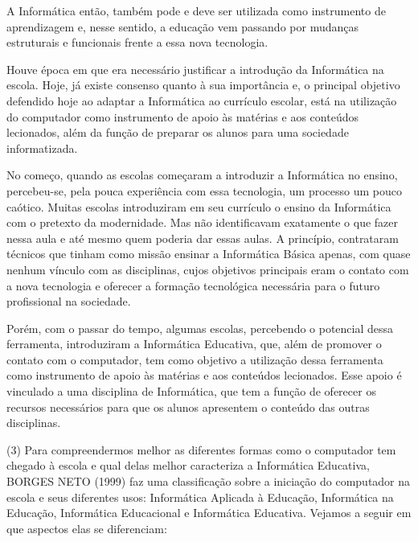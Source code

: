 \documentclass[a4paper,12pt]{report}
\begin{document}
    A Informática então, também pode e deve ser utilizada como instrumento de
    aprendizagem e, nesse sentido, a educação vem passando por mudanças
    estruturais e funcionais frente a essa nova tecnologia.

    Houve época em que era necessário justificar a introdução da Informática na
    escola. Hoje, já existe consenso quanto à sua importância e, o principal
    objetivo defendido hoje ao adaptar a Informática ao currículo escolar, está
    na utilização do computador como instrumento de apoio às matérias e aos
    conteúdos lecionados, além da função de preparar os alunos para uma
    sociedade informatizada.

    No começo, quando as escolas começaram a introduzir a Informática no ensino,
    percebeu-se, pela pouca experiência com essa tecnologia, um processo um
    pouco caótico. Muitas escolas introduziram em seu currículo o ensino da
    Informática com o pretexto da modernidade. Mas não identificavam exatamente
    o que fazer nessa aula e até mesmo quem poderia dar essas aulas. A
    princípio, contrataram técnicos que tinham como missão ensinar a Informática
    Básica apenas, com quase nenhum vínculo com as disciplinas, cujos objetivos
    principais eram o contato com a nova tecnologia e oferecer a formação
    tecnológica necessária para o futuro profissional na sociedade.

    Porém, com o passar do tempo, algumas escolas, percebendo o potencial dessa
    ferramenta, introduziram a Informática Educativa, que, além de promover o
    contato com o computador, tem como objetivo a utilização dessa ferramenta
    como instrumento de apoio às matérias e aos conteúdos lecionados. Esse apoio
    é vinculado a uma disciplina de Informática, que tem a função de oferecer os
    recursos necessários para que os alunos apresentem o conteúdo das outras
    disciplinas.

    (3) Para compreendermos melhor as diferentes formas como o computador tem
    chegado à escola e qual delas melhor caracteriza a Informática Educativa,
    BORGES NETO (1999) faz uma classificação sobre a iniciação do computador na
    escola e seus diferentes usos: Informática Aplicada à Educação, Informática
    na Educação, Informática Educacional e Informática Educativa. Vejamos a
    seguir em que aspectos elas se diferenciam:
\end{document}

